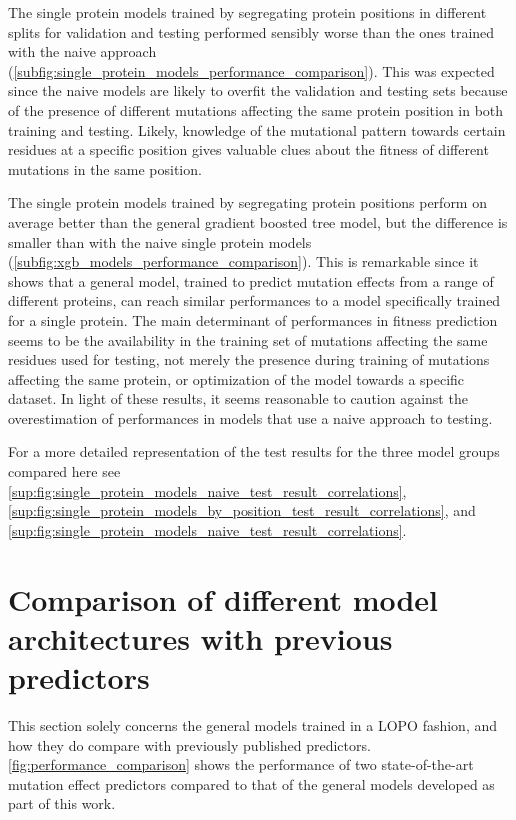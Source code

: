 The single protein models trained by segregating protein positions in different splits for validation and testing performed sensibly worse than the ones trained with the naive approach (\autoref{subfig:single_protein_models_performance_comparison}).
This was expected since the naive models are likely to overfit the validation and testing sets because of the presence of different mutations affecting the same protein position in both training and testing.
Likely, knowledge of the mutational pattern towards certain residues at a specific position gives valuable clues about the fitness of different mutations in the same position.

The single protein models trained by segregating protein positions perform on average better than the general gradient boosted tree model, but the difference is smaller than with the naive single protein models (\autoref{subfig:xgb_models_performance_comparison}).
This is remarkable since it shows that a general model, trained to predict mutation effects from a range of different proteins, can reach similar performances to a model specifically trained for a single protein.
The main determinant of performances in fitness prediction seems to be the availability in the training set of mutations affecting the same residues used for testing, not merely the presence during training of mutations affecting the same protein, or optimization of the model towards a specific dataset.
In light of these results, it seems reasonable to caution against the overestimation of performances in models that use a naive approach to testing.

For a more detailed representation of the test results for the three model groups compared here see \autoref{sup:fig:single_protein_models_naive_test_result_correlations}, \autoref{sup:fig:single_protein_models_by_position_test_result_correlations}, and \autoref{sup:fig:single_protein_models_naive_test_result_correlations}.

\section{Comparison of different model architectures with previous predictors}
This section solely concerns the general models trained in a LOPO fashion, and how they do compare with previously published predictors.
\autoref{fig:performance_comparison} shows the performance of two state-of-the-art mutation effect predictors compared to that of the general models developed as part of this work.

